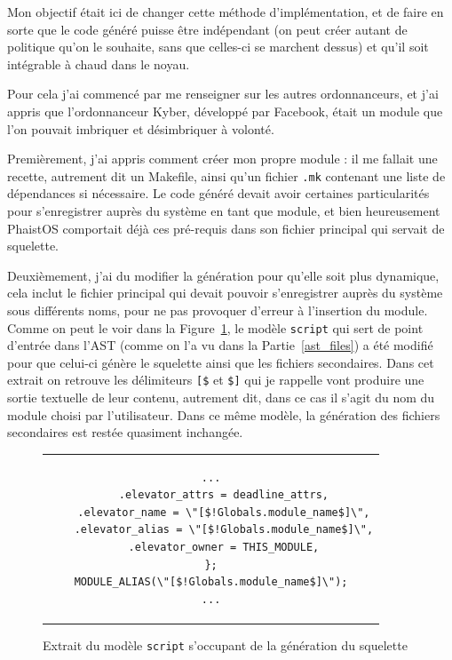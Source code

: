 Mon objectif était ici de changer cette méthode d'implémentation, et de faire 
en sorte que le code généré puisse être indépendant (on peut créer autant de 
politique qu'on le souhaite, sans que celles-ci se marchent dessus) et qu'il 
soit intégrable à chaud dans le noyau.

Pour cela j'ai commencé par me renseigner sur les autres ordonnanceurs, et j'ai 
appris que l'ordonnanceur Kyber, développé par Facebook, était un module que 
l'on pouvait imbriquer et désimbriquer à volonté. 

Premièrement, j'ai appris comment créer mon propre module : il me fallait 
une recette, autrement dit un Makefile, ainsi qu'un fichier \texttt{.mk} 
contenant une liste de dépendances si nécessaire. Le code généré devait avoir 
certaines particularités pour s'enregistrer auprès du système en tant que 
module, et bien heureusement PhaistOS comportait déjà ces pré-requis dans son 
fichier principal qui servait de squelette.

Deuxièmement, j'ai du modifier la génération pour qu'elle soit plus dynamique, 
cela inclut le fichier principal qui devait pouvoir s'enregistrer auprès du 
système sous différents noms, pour ne pas provoquer d'erreur à l'insertion du 
module. Comme on peut le voir dans la Figure~\ref{fig:module_name_c}, le modèle 
\texttt{script} qui sert de point d'entrée dans l'AST (comme on l'a vu dans la 
Partie~\ref{ast_files}) a été modifié pour que celui-ci génère le squelette 
ainsi que les fichiers secondaires. Dans cet extrait on retrouve les 
délimiteurs \texttt{[\$} et \texttt{\$]} qui je rappelle vont produire une 
sortie textuelle de leur contenu, autrement dit, dans ce cas il s'agit du nom 
du module choisi par l'utilisateur. Dans ce même modèle, la génération des 
fichiers secondaires est restée quasiment inchangée.

\begin{figure}[h!t] \centering
    \begin{tabular}{c}
        \begin{lstlisting}[language=Phaistos-Template, linewidth=11.5cm]
    ...
    .elevator_attrs = deadline_attrs,
    .elevator_name = \"[$!Globals.module_name$]\",
    .elevator_alias = \"[$!Globals.module_name$]\",
    .elevator_owner = THIS_MODULE,
};
MODULE_ALIAS(\"[$!Globals.module_name$]\");
...
        \end{lstlisting}
    \end{tabular}
    \caption{Extrait du modèle \texttt{script} s'occupant de la génération du 
    squelette}
    \label{fig:module_name_c}
\end{figure}

